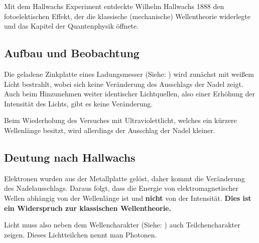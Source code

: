 Mit dem Hallwachs Experiment entdeckte Wilhelm Hallwachs 1888 den fotoelektischen Effekt, der die klassische (mechanische) Wellentheorie widerlegte und das Kapitel der Quantenphysik öffnete.

\subsection{Aufbau und Beobachtung}

Die geladene Zinkplatte eines Ladungsmesser (Siehe: ) wird zunächst mit weißem Licht bestrahlt, wobei sich keine Veränderung des Ausschlags der Nadel zeigt. Auch beim Hinzunehmen weiter identischer Lichtquellen, also einer Erhöhung der Intensität des Lichts, gibt es keine Veränderung.

Beim Wiederholung des Versuches mit Ultraviolettlicht, welches ein kürzere Wellenlänge besitzt, wird allerdings der Ausschlag der Nadel kleiner.

\subsection{Deutung nach Hallwachs}

Elektronen wurden aus der Metallplatte gelöst, daher kommt die Veränderung des Nadelausschlags. Daraus folgt, dass die Energie von elektromagnetischer Wellen abhängig von der Wellenlänge ist und \textbf{nicht} von der Intensität. \textbf{Dies ist ein Widerspruch zur klassischen Wellentheorie.}

Licht muss also neben dem Wellencharakter (Siehe: ) auch Teilchencharakter zeigen. Dieses Lichtteilchen nennt man \glqq Photonen\grqq .